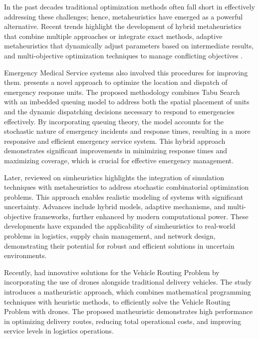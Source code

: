 In the past decades tra\-di\-tio\-nal optimization methods often fall short in effec\-ti\-ve\-ly addressing these challenges; hence, metaheuristics have emerged as a powerful al\-ter\-na\-tive. Recent trends highlight the development of hybrid metaheuristics that combine multiple approaches or in\-te\-grate exact methods, adaptive metaheuristics that dy\-na\-mi\-ca\-lly adjust parameters based on intermediate results, and multi-objective op\-ti\-mi\-za\-tion techniques to manage conflicting objectives \cite{gutjahr2011recent}.

Emergency Medical Service systems also involved this procedures for improving them. \citet{chanta2012hybrid} presents a novel approach to optimize the location and dispatch of emergency response units. The proposed methodology combines Tabu Search with an imbedded queuing model to address both the spatial placement of units and the dynamic dispatching decisions necessary to respond to emergencies effectively. By incorporating queuing theory, the model accounts for the stochastic nature of emergency incidents and response times, resulting in a more responsive and efficient emergency service system. This hybrid approach demonstrates significant improvements in minimizing response times and maximizing coverage, which is crucial for effective emergency management.

Later, \citet{juan2015review} reviewed on simheuristics highlights the integration of simulation techniques with metaheuristics to address stochastic combinatorial optimization problems. This approach enables realistic modeling of systems with significant uncertainty. Advances include hybrid models, adaptive mechanisms, and multi-objective frameworks, further enhanced by modern computational power. These developments have expanded the applicability of simheuristics to real-world problems in logistics, supply chain management, and network design, demonstrating their potential for robust and efficient solutions in uncertain environments.

Recently, \citet{schermer2019matheuristic} had innovative solutions for the Vehicle Routing Problem by incorporating the use of drones alongside traditional delivery vehicles. The study introduces a matheuristic approach, which combines mathematical pro\-gra\-mming techniques with heuristic methods, to efficiently solve the Vehicle Routing Problem with drones. The proposed matheuristic demonstrates high performance in optimizing delivery routes, reducing total operational costs, and improving service levels in logistics operations.

